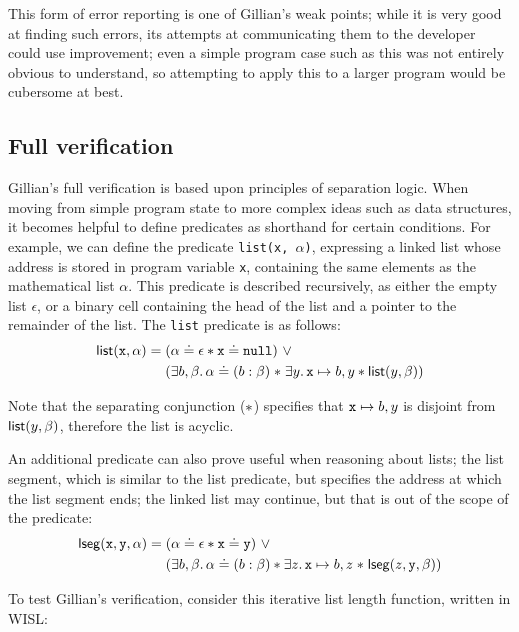 This form of error reporting is one of Gillian's weak points; while it is very
good at finding such errors, its attempts at communicating them to the
developer could use improvement; even a simple program case such as this was
not entirely obvious to understand, so attempting to apply this to a larger
program would be cubersome at best.

\subsection{Full verification}

Gillian's full verification is based upon principles of separation logic. When
moving from simple program state to more complex ideas such as data structures,
it becomes helpful to define predicates as shorthand for certain conditions.
For example, we can define the predicate \texttt{list(x, $\alpha$)}, expressing
a linked list whose address is stored in program variable \texttt{x},
containing the same elements as the mathematical list $\alpha$. This predicate
is described recursively, as either the empty list $\epsilon$, or a binary cell
containing the head of the list and a pointer to the remainder of the list. The
\texttt{list} predicate is as follows:
\begin{align*}
  \mathsf{list}(\mathtt{x}, \alpha) =\; &(\alpha \doteq \epsilon \ast \mathtt{x} \doteq \mathtt{null})~\lor\\
  & (\exists b, \beta \ldotp \alpha \doteq (b : \beta) \mathrel{*} \exists y \ldotp \mathtt{x} \mapsto b, y \ast \mathsf{list}(y, \beta))
\end{align*}

Note that the separating conjunction ($\mathrel{*}$) specifies that
$\mathtt{x} \mapsto b, y$ is disjoint from $\mathsf{list}(y, \beta)$, therefore the
list is acyclic.

An additional predicate can also prove useful when reasoning about lists; the
list segment, which is similar to the list predicate, but specifies the address
at which the list segment ends; the linked list may continue, but that is out
of the scope of the predicate:
\begin{align*}
  \mathsf{lseg}(\mathtt{x}, \mathtt{y}, \alpha) =\; &(\alpha \doteq \epsilon \ast \mathtt{x} \doteq \mathtt{y})~\lor\\
  &(\exists b, \beta \ldotp \alpha \doteq (b : \beta) \ast \exists z \ldotp \mathtt{x} \mapsto b, z \mathrel{*} \mathsf{lseg}(z, \mathtt{y}, \beta))
\end{align*}

To test Gillian's verification, consider this iterative list length function,
written in WISL:\@

